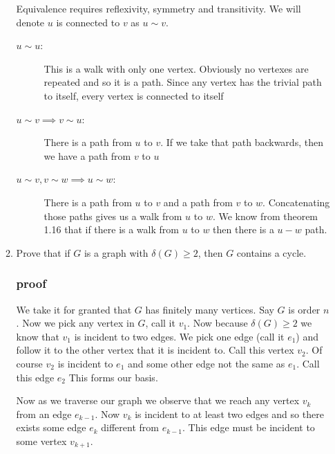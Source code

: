 \documentclass[letterpaper]{article}
\begin{document}
\begin{enumerate}
\begin{enumerate}
  Equivalence requires reflexivity, symmetry and transitivity. We will denote $u$ is connected to $v$ as $u\sim v$.
  \begin{description}
  \item[$u\sim u$:]
  This is a walk with only one vertex. Obviously no vertexes are repeated and so it is a path. Since any vertex has the trivial path to itself, every vertex is connected to itself
  \item[$u\sim v\implies v\sim u$:]
  There is a path from $u$ to $v$. If we take that path backwards, then we have a path from $v$ to $u$
  \item[$u\sim v, v\sim w\implies u\sim w$:]
  There is a path from $u$ to $v$ and a path from $v$ to $w$. Concatenating those paths gives us a walk from $u$ to $w$. We know from theorem 1.16 that if there is a walk from $u$ to $w$ then there is a $u-w$ path.
  \end{description}
  \setcounter{enumii}{12}
  \item
  Prove that if $G$ is a graph with $\delta(G)\ge 2$, then $G$ contains a cycle.
  \subsubsection*{proof}
  We take it for granted that $G$ has finitely many vertices.
  Say $G$ is order $n$.
  Now we pick any vertex in $G$, call it $v_1$.
  Now because $\delta(G)\ge 2$ we know that $v_1$ is incident to two edges.
  We pick one edge (call it $e_1$) and follow it to the other vertex that it is incident to.
  Call this vertex $v_2$. Of course $v_2$ is incident to $e_1$ and some other edge not the same as $e_1$. Call this edge $e_2$
  This forms our basis.

  Now as we traverse our graph we observe that we reach any vertex $v_k$ from an edge $e_{k-1}$. Now $v_k$ is incident to at least two edges and so there exists some edge $e_k$ different from $e_{k-1}$. This edge must be incident to some vertex $v_{k+1}$.


\end{enumerate}
\end{enumerate}
\end{document}
